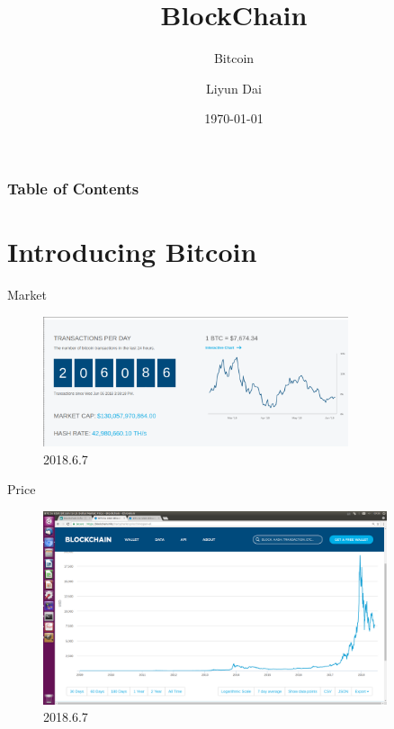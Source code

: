 \documentclass[serif]{beamer}
\title{BlockChain}
\subtitle{Bitcoin}
\author{ Liyun Dai}
\institute{RISE, Southwest University, Chongqing, China}
\date{\today}
\begin{document}
\maketitle
\begin{frame}
  \frametitle{Table of Contents}
  \tableofcontents[currentsection]
\end{frame}

\section{Introducing Bitcoin}

\begin{frame}{Market}
	
	\begin{figure}
		\includegraphics[width=0.8\textwidth]{bitcoin}
		\caption{2018.6.7}
		\label{fig:mark}
	\end{figure}
	
\end{frame}
\begin{frame}{Price}
	
	\begin{figure}
		\includegraphics[width=0.9\textwidth]{price}
		\caption{2018.6.7}
		\label{fig:price}
	\end{figure}
	
\end{frame}
\end{document}
